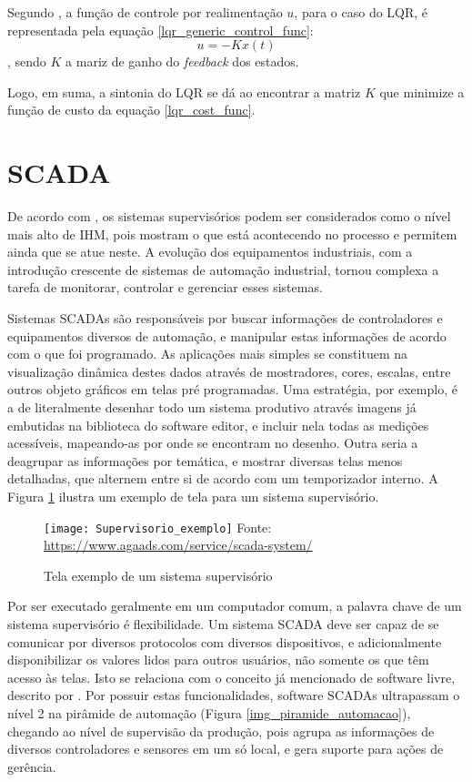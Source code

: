 Segundo , a função de controle por realimentação $u$, para o caso do LQR, é representada pela equação \ref{lqr_generic_control_func}:
\begin{equation}
u = -Kx(t)
\label{lqr_generic_control_func}
\end{equation},
sendo $K$ a mariz de ganho do \emph{feedback} dos estados.

Logo, em suma, a sintonia do LQR se dá ao encontrar a matriz $K$ que minimize a função de custo da equação \ref{lqr_cost_func}.

\section{SCADA}

De acordo com , os sistemas supervisórios podem ser considerados como o nível mais alto de IHM, pois mostram o que está acontecendo no processo e permitem ainda que se atue neste. A evolução dos equipamentos industriais, com a introdução crescente de sistemas de automação industrial, tornou complexa a tarefa de monitorar, controlar e gerenciar esses sistemas. 

Sistemas SCADAs são responsáveis por buscar informações de controladores e equipamentos diversos de automação, e manipular estas informações de acordo com o que foi programado. As aplicações mais simples se constituem na visualização dinâmica destes dados através de mostradores, cores, escalas, entre outros objeto gráficos em telas pré programadas. Uma estratégia, por exemplo, é a de literalmente desenhar todo um sistema produtivo através imagens já embutidas na biblioteca do software editor, e incluir nela todas as medições acessíveis, mapeando-as por onde se encontram no desenho. Outra seria a deagrupar as informações por temática, e mostrar diversas telas menos detalhadas, que alternem entre si de acordo com um temporizador interno. A Figura \ref{img_supervisorio_exemplo} ilustra um exemplo de tela para um sistema supervisório.

\begin{figure}[hbt]
	\centering
	\caption{Tela exemplo de um sistema supervisório}
	\texttt{[image: Supervisorio\_exemplo]}
	Fonte: \href{https://www.agaads.com/service/scada-system/}{https://www.agaads.com/service/scada-system/}
	\label{img_supervisorio_exemplo}
\end{figure}

Por ser executado geralmente em um computador comum, a palavra chave de um sistema supervisório é flexibilidade. Um sistema SCADA deve ser capaz de se comunicar por diversos protocolos com diversos dispositivos, e adicionalmente disponibilizar os valores lidos para outros usuários, não somente os que têm acesso às telas. Isto se relaciona com o conceito já mencionado de software livre, descrito por . Por possuir estas funcionalidades, software SCADAs ultrapassam o nível 2 na pirâmide de automação (Figura \ref{img_piramide_automacao}), chegando ao nível de supervisão da produção, pois agrupa as informações de diversos controladores e sensores em um só local, e gera suporte para ações de gerência.


